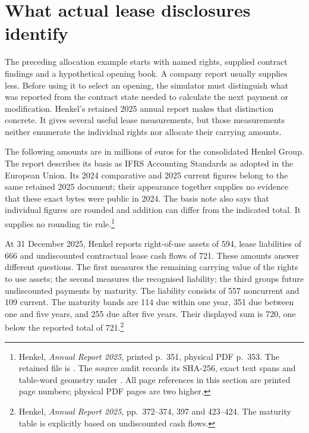 \section{What actual lease disclosures identify}
\label{sec:henkel-lease-measurements}

The preceding allocation example starts with named rights, supplied contract
findings and a hypothetical opening book. A company report usually supplies
less. Before using it to select an opening, the simulator must distinguish what
was reported from the contract state needed to calculate the next payment or
modification. Henkel's retained 2025 annual report makes that distinction
concrete. It gives several useful lease measurements, but those measurements
neither enumerate the individual rights nor allocate their carrying amounts.

The following amounts are in millions of euros for the consolidated Henkel
Group. The report describes its basis as IFRS Accounting Standards as adopted
in the European Union. Its 2024 comparative and 2025 current figures belong to
the same retained 2025 document; their appearance together supplies no evidence
that these exact bytes were public in 2024. The basis note also says that
individual figures are rounded and addition can differ from the indicated
total. It supplies no rounding tie rule.\footnote{Henkel, \emph{Annual Report
2025}, printed p.~351, physical PDF p.~353. The retained file is
.
The source audit records its SHA-256, exact text spans and table-word geometry
under . All page
references in this section are printed page numbers; physical PDF pages are
two higher.}

At 31 December 2025, Henkel reports right-of-use assets of 594, lease
liabilities of 666 and undiscounted contractual lease cash flows of 721.
These amounts answer different questions. The first measures the remaining
carrying value of the rights to use assets; the second measures the recognised
liability; the third groups future undiscounted payments by maturity. The
liability consists of 557 noncurrent and 109 current. The maturity bands are
114 due within one year, 351 due between one and five years, and 255 due after
five years. Their displayed sum is 720, one below the reported total of
721.\footnote{Henkel, \emph{Annual Report 2025}, pp.~372--374, 397 and 423--424.
The maturity table is explicitly based on undiscounted cash flows.}

